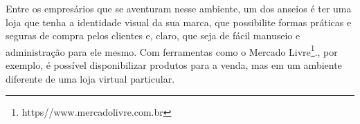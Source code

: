 \documentclass[a4paper,12pt]{monografia}
\begin{document}
Entre os empresários que se aventuram nesse ambiente, um dos anseios é ter uma loja que tenha a identidade visual da sua marca, que possibilite formas práticas e seguras de compra pelos clientes e, claro, que seja de fácil manuseio e administração para ele mesmo. Com ferramentas como o Mercado Livre\footnote{https//www.mercadolivre.com.br}., por exemplo, é possível disponibilizar produtos para a venda, mas em um ambiente diferente de uma loja virtual particular.







\end{document}
